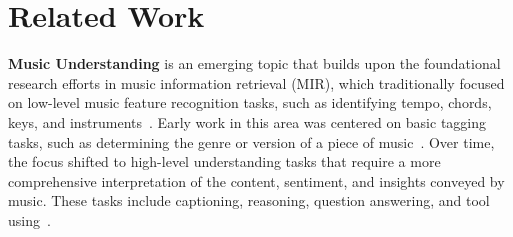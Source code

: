 \section{Related Work}
\noindent \textbf{Music Understanding}
is an emerging topic that builds upon the foundational research efforts in music information retrieval (MIR), which traditionally focused on low-level music feature recognition tasks, such as identifying tempo, chords, keys, and instruments~\cite{DBLP:conf/ecir/FaraldoGJH16,DBLP:conf/ismir/PauwelsOGS19,DBLP:conf/ismir/GururaniSL19,DBLP:journals/tismir/SchreiberUM20}. Early work in this area was centered on basic tagging tasks, such as determining the genre or version of a piece of music~\cite{DBLP:conf/ismir/Tzanetakis01,DBLP:conf/icassp/WonONGS21,DBLP:journals/spm/YesilerDBTS21}. Over time, the focus shifted to high-level understanding tasks that require a more comprehensive interpretation of the content, sentiment, and insights conveyed by music. These tasks include captioning, reasoning, question answering, and tool using~\cite{DBLP:conf/ijcnn/MancoBQF21,DBLP:conf/icml/GardnerDSB24,DBLP:journals/corr/abs-2301-11325,DBLP:conf/icassp/LiuHSS24,deng-etal-2024-musilingo,DBLP:journals/corr/abs-2410-15573}.


